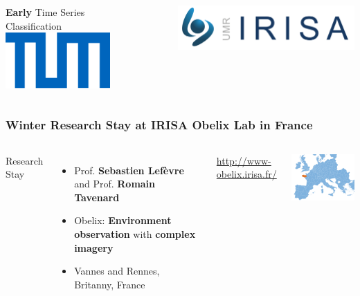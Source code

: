 

{
	\begin{frame}[plain]
	\vfill
	\Huge\color{tumbluedark}
	\begin{columns}
		\vspace{4em}
		
		\hfill \textbf{Early} Time Series \\\hfill Classification
		\includegraphics[width=4cm]{images/TUM-blue}
		
		\vspace{1em}
		\includegraphics[width=7cm]{images/Irisa}
	\end{columns}
	
	\vfill
\end{frame}
}


\begin{frame}
	\frametitle{Winter Research Stay at IRISA Obelix Lab in France}
	
	\begin{columns}
		\column{.5\textwidth}
		
		Research Stay
		\begin{itemize}[itemsep=1em]
			\item Prof. \textbf{Sebastien Lefèvre} and Prof. \textbf{Romain Tavenard}
			\item Obelix: \textbf{Environment observation} with \textbf{complex imagery}
			\item Vannes and Rennes, Britanny, France
		\end{itemize}
		
		\vspace{1em}
		\url{http://www-obelix.irisa.fr/}
		
		\column{.5\textwidth}
		
		\includegraphics[width=5cm]{images/map/europe}
		
	\end{columns}
	
\end{frame}


